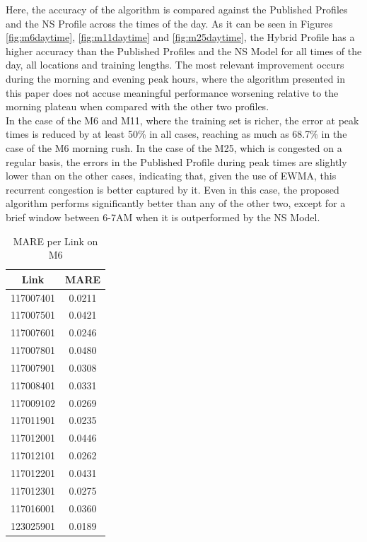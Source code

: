 \documentclass[conference, letterpaper]{IEEEtran}
\begin{document}
Here, the accuracy of the algorithm is compared against the Published Profiles and the NS Profile across the times of the day.
As it can be seen in Figures \ref{fig:m6daytime}, \ref{fig:m11daytime} and \ref{fig:m25daytime}, the Hybrid Profile has a higher accuracy than the Published Profiles and the NS Model for all times of the day, all locations and training lengths. 
The most relevant improvement occurs during the morning and evening peak hours, where the algorithm presented in this paper does not accuse meaningful performance worsening relative to the morning plateau when compared with the other two profiles.\\
In the case of the M6 and M11, where the training set is richer, the error at peak times is reduced by at least 50\% in all cases, reaching as much as 68.7\% in the case of the M6 morning rush.
In the case of the M25, which is congested on a regular basis, the errors in the Published Profile during peak times are slightly lower than on the other cases, indicating that, given the use of EWMA, this recurrent congestion is better captured by it. 
Even in this case, the proposed algorithm performs significantly better than any of the other two, except for a brief window between 6-7AM when it is outperformed by the NS Model.

\begin{table}[htbp]
	\caption{MARE per Link on M6}
	\begin{center}
		\begin{tabular}{|c|c|}
			\hline
			\textbf{Link}&{\textbf{MARE}} \\
			\hline
			117007401& 0.0211\\
			\hline
			117007501& 0.0421\\
			\hline
			117007601& 0.0246\\
			\hline
			117007801& 0.0480\\
			\hline
			117007901& 0.0308\\
			\hline
			117008401& 0.0331\\
			\hline
			117009102& 0.0269\\
			\hline
			117011901& 0.0235\\
			\hline
			117012001& 0.0446\\
			\hline
			117012101& 0.0262\\
			\hline
			117012201& 0.0431\\
			\hline
			117012301& 0.0275\\
			\hline
			117016001& 0.0360\\
			\hline
			123025901& 0.0189\\
			\hline
		\end{tabular}
		\label{tab1}
	\end{center}
	\label{table:m6mape}
\end{table}
\end{document}
